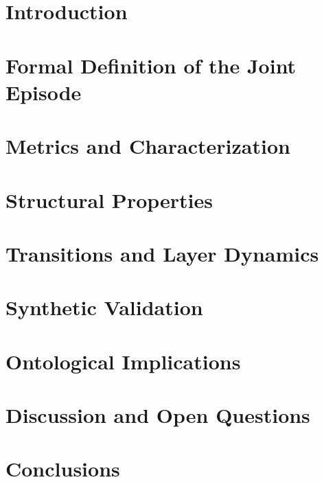 \documentclass[11pt,a4paper]{article}
\begin{document}
\vspace{0.5em}

\section{Introduction}


\section{Formal Definition of the Joint Episode}


\section{Metrics and Characterization}


\section{Structural Properties}


\section{Transitions and Layer Dynamics}


\section{Synthetic Validation}


\section{Ontological Implications}


\section{Discussion and Open Questions}


\section{Conclusions}


\nocite{*}
\begingroup
\sloppy


\endgroup
\end{document}
